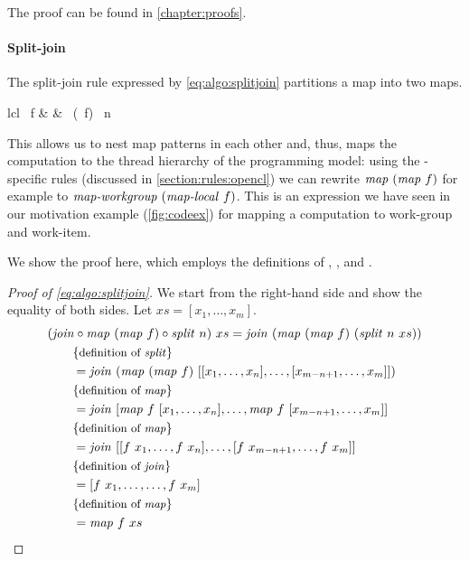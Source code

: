 The proof can be found in \autoref{chapter:proofs}.

\paragraph{Split-join}
The split-join rule expressed by \autoref{eq:algo:splitjoin} partitions a map into two maps.
%
\begin{rerule}{lcl}
  \map\ f
    & \rightarrow &
      \join \circ \map\ (\map\ f) \circ \splitN\ n
  \label{eq:algo:splitjoin}
\end{rerule}
%
This allows us to nest map patterns in each other and, thus, maps the computation to the thread hierarchy of the \OpenCL programming model:
using the \OpenCL-specific rules (discussed in \autoref{section:rules:opencl}) we can rewrite $\text{\textit{map}}\ (\text{\textit{map}}\ f)$ for example to $\text{\textit{map-workgroup}}\ (\text{\textit{map-local}}\ f)$.
This is an expression we have seen in our motivation example (\autoref{fig:codeex}) for mapping a computation to \OpenCL work-group and work-item.

We show the proof here, which employs the definitions of \splitN, \map, and \join.

\begin{proof}[Proof of \autoref{eq:algo:splitjoin}]
  We start from the right-hand side and show the equality of both sides.
  Let $xs = [x_1, \ldots, x_m]$.
  \begin{align*}
    &(\join \circ \map\ (\map\ f) \circ \splitN\ n)\ xs = \join\ (\map\ (\map\ f)\ (\splitN\ n\ xs))\\
    &\qquad \comment{definition of \splitN}\\
    &\qquad = \join\ (\map\ (\map\ f)\ [[x_1, \ldots, x_n], \ldots, [x_{m-n+1}, \ldots, x_m]])\\
    &\qquad \comment{definition of \map}\\
    &\qquad = \join\ [\map\ f\ [x_1, \ldots, x_n], \ldots, \map\ f\ [x_{m-n+1}, \ldots, x_m]]\\
    &\qquad \comment{definition of \map}\\
    &\qquad = \join\ [[f\ x_1, \ldots, f\ x_n], \ldots, [f\ x_{m-n+1}, \ldots, f\ x_m]]\\
    &\qquad \comment{definition of \join}\\
    &\qquad = [f\ x_1, \ldots, \ldots, f\ x_m]\\
    &\qquad \comment{definition of \map}\\
    &\qquad = \map\ f\ xs
  \end{align*}
\end{proof}

